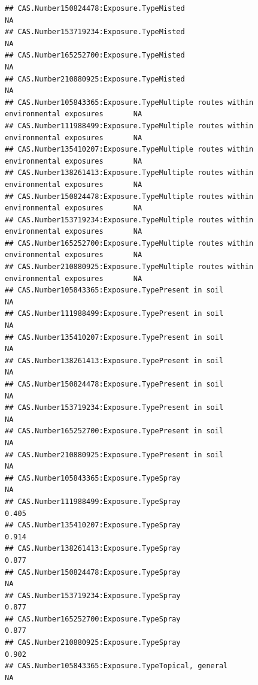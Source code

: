 \documentclass[
  12pt,
]{article}
\begin{document}
\begin{verbatim}
## CAS.Number150824478:Exposure.TypeMisted                                               NA
## CAS.Number153719234:Exposure.TypeMisted                                               NA
## CAS.Number165252700:Exposure.TypeMisted                                               NA
## CAS.Number210880925:Exposure.TypeMisted                                               NA
## CAS.Number105843365:Exposure.TypeMultiple routes within environmental exposures       NA
## CAS.Number111988499:Exposure.TypeMultiple routes within environmental exposures       NA
## CAS.Number135410207:Exposure.TypeMultiple routes within environmental exposures       NA
## CAS.Number138261413:Exposure.TypeMultiple routes within environmental exposures       NA
## CAS.Number150824478:Exposure.TypeMultiple routes within environmental exposures       NA
## CAS.Number153719234:Exposure.TypeMultiple routes within environmental exposures       NA
## CAS.Number165252700:Exposure.TypeMultiple routes within environmental exposures       NA
## CAS.Number210880925:Exposure.TypeMultiple routes within environmental exposures       NA
## CAS.Number105843365:Exposure.TypePresent in soil                                      NA
## CAS.Number111988499:Exposure.TypePresent in soil                                      NA
## CAS.Number135410207:Exposure.TypePresent in soil                                      NA
## CAS.Number138261413:Exposure.TypePresent in soil                                      NA
## CAS.Number150824478:Exposure.TypePresent in soil                                      NA
## CAS.Number153719234:Exposure.TypePresent in soil                                      NA
## CAS.Number165252700:Exposure.TypePresent in soil                                      NA
## CAS.Number210880925:Exposure.TypePresent in soil                                      NA
## CAS.Number105843365:Exposure.TypeSpray                                                NA
## CAS.Number111988499:Exposure.TypeSpray                                             0.405
## CAS.Number135410207:Exposure.TypeSpray                                             0.914
## CAS.Number138261413:Exposure.TypeSpray                                             0.877
## CAS.Number150824478:Exposure.TypeSpray                                                NA
## CAS.Number153719234:Exposure.TypeSpray                                             0.877
## CAS.Number165252700:Exposure.TypeSpray                                             0.877
## CAS.Number210880925:Exposure.TypeSpray                                             0.902
## CAS.Number105843365:Exposure.TypeTopical, general                                     NA

\end{verbatim}
\end{document}
